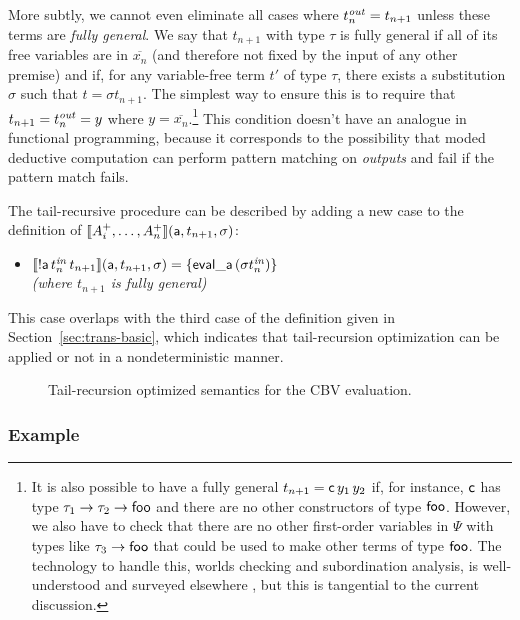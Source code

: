 More subtly, we cannot even eliminate all cases where $t^{\it out}_n =
t_{n+1}$ unless these terms are {\it fully general}. We say that
$t_{n+1}$ with type $\tau$ is fully general if all of its free
variables are in $\overline{x_n}$ (and therefore not fixed by the
input of any other premise) and if, for any variable-free term $t'$ of
type $\tau$, there exists a substitution $\sigma$ such that $t =
{\sigma}t_{n+1}$. The simplest way to ensure this is to require
that $t_{n+1} = t^{\it out}_n = y$ where $y =
\overline{x_n}$.\footnote{It is also possible to have a fully general
  $t_{n+1} = {\sf c}\,y_1\,y_2$ if, for instance, ${\sf c}$ has type
  $\tau_1 \rightarrow \tau_2 \rightarrow {\sf foo}$ and there are no
  other constructors of type ${\sf foo}$. However, we also have to
  check that there are no other first-order variables in $\Psi$ with
  types like $\tau_3 \rightarrow {\sf foo}$ that could be used to make
  other terms of type ${\sf foo}$. The technology to handle this,
  worlds checking and subordination analysis, is well-understood and
  surveyed elsewhere \cite{harper07mechanizing}, but this is
  tangential to the current discussion.} This condition doesn't have
an analogue in functional programming, because it corresponds to the
possibility that moded deductive computation can perform pattern
matching on {\it outputs} and fail if the pattern match fails.

The tail-recursive procedure can be described by adding a new 
case to the definition of 
$\llbracket {A^+_i,\ldots,A^+_n} \rrbracket({\sf a},{t_{n+1}},{\sigma})$:

\begin{itemize}
\item $\llbracket {{!}{\sf a}\,t^{\it in}_n\,t_{n+1}} \rrbracket({\sf a},{t_{n+1}},{\sigma}) 
  = \{{\sf eval\_a}\,({\sigma}{t^{\it in}_n})\}$
\\
  {\it (where $t_{n+1}$ is fully general)}
\end{itemize}
This case overlaps with the third case of the definition given
in Section~\ref{sec:trans-basic}, which indicates that tail-recursion
optimization can be applied or not in a nondeterministic manner.

\begin{figure}
\caption{Tail-recursion optimized semantics for the CBV
  evaluation.}
\label{fig:cbv-ev-ssos-tail}
\end{figure}

\subsubsection{Example}

